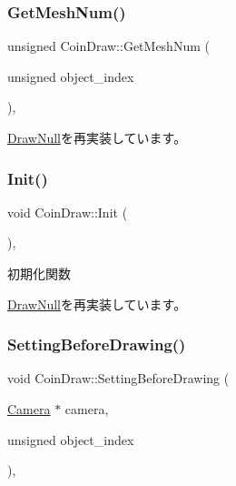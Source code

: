 \subsubsection{\texorpdfstring{Get\+Mesh\+Num()}{GetMeshNum()}}
{\footnotesize\ttfamily unsigned Coin\+Draw\+::\+Get\+Mesh\+Num (\begin{DoxyParamCaption}\item[{unsigned}]{object\+\_\+index }\end{DoxyParamCaption})\hspace{0.3cm}{\ttfamily [override]}, {\ttfamily [virtual]}}



\mbox{\hyperlink{class_draw_null_ad735978a85a5f3583eecd82d6bfe6413}{Draw\+Null}}を再実装しています。

\mbox{\label{class_coin_draw_ad0f5da5cfb896541fd59b1ab4a8593d1}} 
\subsubsection{\texorpdfstring{Init()}{Init()}}
{\footnotesize\ttfamily void Coin\+Draw\+::\+Init (\begin{DoxyParamCaption}{ }\end{DoxyParamCaption})\hspace{0.3cm}{\ttfamily [override]}, {\ttfamily [virtual]}}



初期化関数 



\mbox{\hyperlink{class_draw_null_acd7fef3ccea1da537ac9507ffbb6dd2e}{Draw\+Null}}を再実装しています。

\mbox{\label{class_coin_draw_a66c03acd675ac1820977cb21015abfdb}} 
\subsubsection{\texorpdfstring{Setting\+Before\+Drawing()}{SettingBeforeDrawing()}}
{\footnotesize\ttfamily void Coin\+Draw\+::\+Setting\+Before\+Drawing (\begin{DoxyParamCaption}\item[{\mbox{\hyperlink{class_camera}{Camera}} $\ast$}]{camera,  }\item[{unsigned}]{object\+\_\+index }\end{DoxyParamCaption})\hspace{0.3cm}{\ttfamily [override]}, {\ttfamily [virtual]}}



